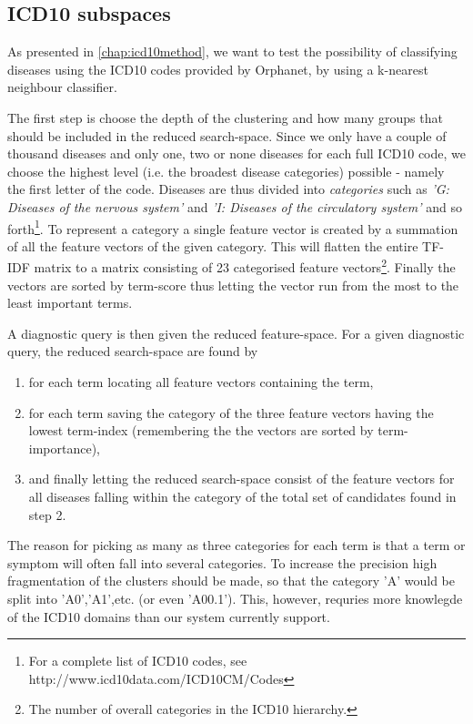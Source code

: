 \documentclass[10pt,letterpaper,final]{article}
\begin{document}

\subsection{ICD10 subspaces}
As presented in \ref{chap:icd10method}, we want to test the possibility
of classifying diseases using the ICD10 codes provided by Orphanet, by
using a k-nearest neighbour classifier.


The first step is choose the depth of the clustering and how many groups that should
be included in the reduced search-space. Since we only have a couple of thousand 
diseases and only one, two or none diseases for each full ICD10 code, we choose the
highest level (i.e. the broadest disease categories) possible - namely the first letter
of the code. Diseases are thus divided into \textit{categories} such as \textit{'G: Diseases of the nervous system'}
and \textit{'I: Diseases of the circulatory system'} and so forth\footnote{For a complete list of ICD10 codes, see http://www.icd10data.com/ICD10CM/Codes}. To represent a
category a single feature vector is created by a summation of all the feature vectors of 
the given category. This will flatten the entire TF-IDF matrix to a matrix consisting
of 23 categorised feature vectors\footnote{The number of overall categories in the ICD10 hierarchy.}. 
Finally the vectors are sorted by term-score thus letting the vector run from
the most to the least important terms.

A diagnostic query is then given the reduced feature-space. For a given
diagnostic query, the reduced search-space are found by
\begin{enumerate}
    \item for each term locating all feature vectors containing the term,
    \item for each term saving the category of the three feature vectors having the lowest term-index (remembering the the vectors are sorted by term-importance),
    \item and finally letting the reduced search-space consist of the feature vectors for all diseases falling within the category of the total set of candidates found in step 2.
\end{enumerate}
The reason for picking as many as three categories for each term is that
a term or symptom will often fall into several categories. To increase
the precision high fragmentation of the clusters should be made, so that
the category 'A' would be split into 'A0','A1',etc. (or even 'A00.1').
This, however, requries more knowlegde of the ICD10 domains than our
system currently support. 
\end{document}
